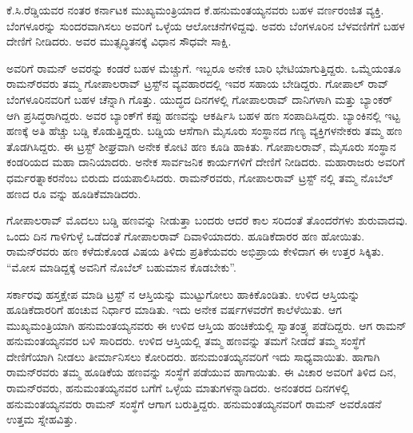 
\vskip 2pt

ಕೆ.ಸಿ.ರೆಡ್ಡಿಯವರ ನಂತರ ಕರ್ನಾಟಕ ಮುಖ್ಯಮಂತ್ರಿಯಾದ ಕೆ.ಹನುಮಂತಯ್ಯನವರು ಬಹಳ ವರ್ಣರಂಜಿತ ವ್ಯಕ್ತಿ. ಬೆಂಗಳೂರನ್ನು ಸುಂದರವಾಗಿಸಲು ಅವರಿಗೆ ಒಳ್ಳೆಯ ಆಲೋಚನೆಗಳಿದ್ದವು. ಅವರು ಬೆಂಗಳೂರಿನ ಬೆಳವಣಿಗೆಗೆ ಬಹಳ ದೇಣಿಗೆ ನೀಡಿದರು. ಅವರ ಮುತ್ಸದ್ಧಿತನಕ್ಕೆ ವಿಧಾನ ಸೌಧವೇ ಸಾಕ್ಷಿ.

ಅವರಿಗೆ ರಾಮನ್ ಅವರನ್ನು ಕಂಡರೆ ಬಹಳ ಮೆಚ್ಚುಗೆ. ಇಬ್ಬರೂ ಅನೇಕ ಬಾರಿ ಭೇಟಿಯಾಗು\-ತ್ತಿದ್ದರು. ಒಮ್ಮೆಯಂತೂ ರಾಮನ್‍ರವರು ತಮ್ಮ ಗೋಪಾಲರಾವ್ ಟ್ರಸ್ಟ್‌ನ ವ್ಯವಹಾರದಲ್ಲಿ ಇವರ ಸಹಾಯ ಬೇಡಿದ್ದರು. ಗೋಪಾಲ್ ರಾವ್ ಬೆಂಗಳೂರಿನವರಿಗೆ ಬಹಳ ಚೆನ್ನಾಗಿ ಗೊತ್ತು. ಯುದ್ಧದ ದಿನಗಳಲ್ಲಿ ಗೋಪಾಲರಾವ್ ದಾನಿಗಳಾಗಿ ಮತ್ತು ಬ್ಯಾಂಕರ್ ಆಗಿ ಪ್ರಸಿದ್ಧರಾಗಿದ್ದರು. ಅವರ ಬ್ಯಾಂಕ್‍ಗೆ ಕಪ್ಪು ಹಣವನ್ನು ಆಕರ್ಷಿಸಿ ಬಹಳ ಹಣ ಸಂಪಾದಿಸಿದ್ದರು. ಬ್ಯಾಂಕಿನಲ್ಲಿ ಇಟ್ಟ ಹಣಕ್ಕೆ ಅತಿ ಹೆಚ್ಚು ಬಡ್ಡಿ ಕೊಡುತ್ತಿದ್ದರು. ಬಡ್ಡಿಯ ಆಸೆಗಾಗಿ ಮೈಸೂರು ಸಂಸ್ಥಾನದ ಗಣ್ಯ ವ್ಯಕ್ತಿಗಳನೇಕರು ತಮ್ಮ ಹಣ ತೊಡಗಿಸಿದ್ದರು. ಈ ಟ್ರಸ್ಟ್ ಶೀಘ್ರವಾಗಿ ಅನೇಕ ಕೋಟಿ ಹಣ ಕೂಡಿ ಹಾಕಿತು. ಗೋಪಾಲರಾವ್, ಮೈಸೂರು ಸಂಸ್ಥಾನ ಕಂಡರಿಯದ ಮಹಾ ದಾನಿಯಾದರು. ಅನೇಕ ಸಾರ್ವಜನಿಕ ಕಾರ್ಯಗಳಿಗೆ ದೇಣಿಗೆ ನೀಡಿದರು. ಮಹಾರಾಜರು ಅವರಿಗೆ ಧರ್ಮರತ್ನಾಕರನೆಂಬ ಬಿರುದು ದಯಪಾಲಿಸಿದರು. ರಾಮನ್‍ರವರು, ಗೋಪಾಲರಾವ್ ಟ್ರಸ್ಟ್ ನಲ್ಲಿ ತಮ್ಮ ನೊಬೆಲ್ ಹಣದ ರೂ  ವನ್ನು ಹೂಡಿಕೆಮಾಡಿದರು.

ಗೋಪಾಲರಾವ್ ಮೊದಲು ಬಡ್ಡಿ ಹಣವನ್ನು ನೀಡುತ್ತಾ ಬಂದರು ಆದರೆ ಕಾಲ ಸರಿದಂತೆ ತೊಂದರೆಗಳು ಶುರುವಾದವು. ಒಂದು ದಿನ ಗಾಳಿಗುಳ್ಳೆ ಒಡೆದಂತೆ ಗೋಪಾಲರಾವ್ ದಿವಾಳಿಯಾದರು. ಹೂಡಿಕೆದಾರರ ಹಣ ಹೋಯಿತು. ರಾಮನ್‍ರವರು ಹಣ ಕಳೆದುಕೊಂಡ ವಿಷಯ ತಿಳಿದು ಪ್ರತಿಕೆಯವರು ಅಭಿಪ್ರಾಯ ಕೇಳಿದಾಗ ಈ ಉತ್ತರ ಸಿಕ್ಕಿತು. “ಮೋಸ ಮಾಡಿದ್ದಕ್ಕೆ ಅವನಿಗೆ ನೊಬೆಲ್ ಬಹುಮಾನ ಕೊಡಬೇಕು”.

ಸರ್ಕಾರವು ಹಸ್ತಕ್ಷೇಪ ಮಾಡಿ ಟ್ರಸ್ಟ್ ನ ಆಸ್ತಿಯನ್ನು ಮುಟ್ಟುಗೋಲು ಹಾಕಿಕೊಂಡಿತು. ಉಳಿದ ಆಸ್ತಿಯನ್ನು ಹೂಡಿಕೆದಾರರಿಗೆ ಹಂಚುವ ನಿರ್ಧಾರ ಮಾಡಿತು. ಇದು ಅನೇಕ ವರ್ಷಗಳವರೆಗೆ ಕಾಲೆಳೆಯಿತು. ಆಗ ಮುಖ್ಯಮಂತ್ರಿಯಾಗಿ ಹನುಮಂತಯ್ಯನವರು ಈ ಉಳಿದ ಆಸ್ತಿಯ ಹಂಚಿಕೆ\-ಯಲ್ಲಿ ಸ್ವಾತಂತ್ರ್ಯ ಪಡೆದಿದ್ದರು. ಆಗ ರಾಮನ್ ಹನುಮಂತಯ್ಯನವರ ಬಳಿ ಸಾರಿದರು. ಉಳಿದ ಆಸ್ತಿಯಲ್ಲಿ ತಮ್ಮ ಹಣವನ್ನು ತಮಗೆ ನೀಡದೆ ತಮ್ಮ ಸಂಸ್ಥೆಗೆ ದೇಣಿಗೆಯಾಗಿ ನೀಡಲು ತೀರ್ಮಾನಿಸಲು ಕೋರಿದರು. ಹನುಮಂತಯ್ಯನವರಿಗೆ ಇದು ಸಾಧ್ಯವಾಯಿತು. ಹಾಗಾಗಿ ರಾಮನ್‍ರವರು ತಮ್ಮ ಹೂಡಿಕೆಯ ಹಣವನ್ನು ಸಂಸ್ಥೆಗೆ ಪಡೆಯುವ ಹಾಗಾಯಿತು. ಈ ವಿಚಾರ ಅವರಿಗೆ ತಿಳಿದ ದಿನ, ರಾಮನ್‍ರವರು, ಹನುಮಂತಯ್ಯನವರ ಬಗೆಗೆ ಒಳ್ಳೆಯ ಮಾತುಗಳನ್ನಾಡಿದರು. ಅನಂತರದ ದಿನಗಳಲ್ಲಿ ಹನುಮಂತಯ್ಯನವರು ರಾಮನ್ ಸಂಸ್ಥೆಗೆ ಆಗಾಗ ಬರುತ್ತಿದ್ದರು. ಹನುಮಂತಯ್ಯನವರಿಗೆ ರಾಮನ್ ಅವರೊಡನೆ ಉತ್ತಮ ಸ್ನೇಹವಿತ್ತು.

